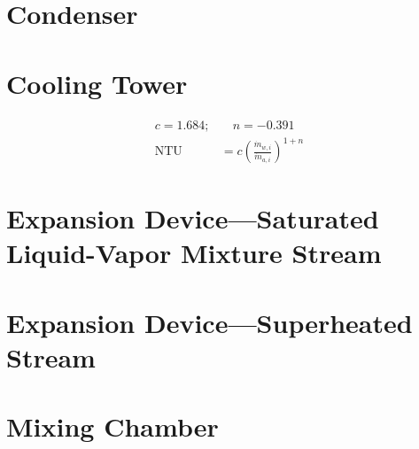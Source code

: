 \section{Condenser} \label{sec:Condenser}

\section{Cooling Tower} \label{sec:CoolingTower}
\begin{align*}
  c = 1.684; &\quad n = - 0.391 \\
  \text{NTU} &= c\left(\frac{\dot{m}_{w,i}}{\dot{m}_{a,i}}\right)^{1 + n}
\end{align*}

\section{Expansion Device---Saturated Liquid-Vapor Mixture Stream} \label{sec:ExpandMain}

\section{Expansion Device---Superheated Stream} \label{sec:ExpandSHV}

\section{Mixing Chamber} \label{sec:Mixing}

